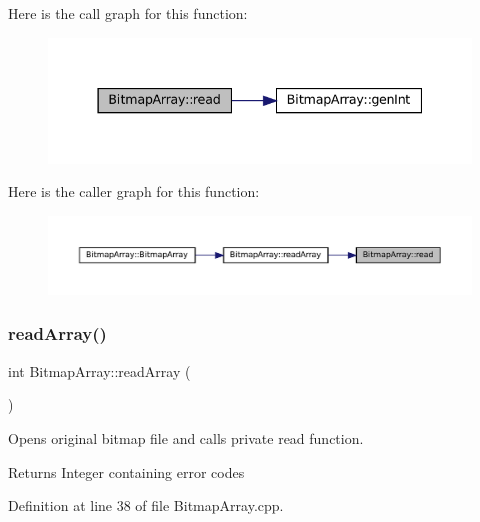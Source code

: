 Here is the call graph for this function\+:
\nopagebreak
\begin{figure}[H]
\begin{center}
\leavevmode
\includegraphics[width=337pt]{classBitmapArray_a3a5834d03cd095769b422d4d66b9435f_cgraph}
\end{center}
\end{figure}
Here is the caller graph for this function\+:
\nopagebreak
\begin{figure}[H]
\begin{center}
\leavevmode
\includegraphics[width=350pt]{classBitmapArray_a3a5834d03cd095769b422d4d66b9435f_icgraph}
\end{center}
\end{figure}
\mbox{\label{classBitmapArray_a4ce4b5acc896040075be63a559799e7e}} 
\subsubsection{\texorpdfstring{readArray()}{readArray()}}
{\footnotesize\ttfamily int Bitmap\+Array\+::read\+Array (\begin{DoxyParamCaption}{ }\end{DoxyParamCaption})}



Opens original bitmap file and calls private read function. 

\begin{DoxyReturn}{Returns}
Integer containing error codes 
\end{DoxyReturn}


Definition at line 38 of file Bitmap\+Array.\+cpp.

